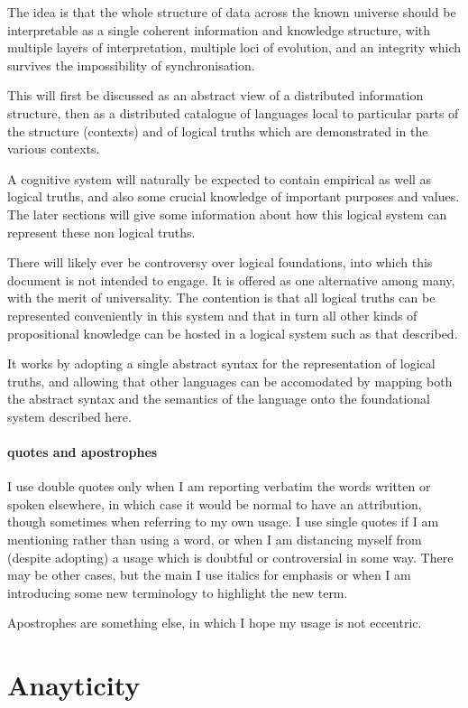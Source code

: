\documentclass[10pt,titlepage]{article}
\begin{document}
The idea is that the whole structure of data across the known universe should be interpretable as a single coherent information and knowledge structure, with multiple layers of interpretation, multiple loci of evolution, and an integrity which survives the impossibility of synchronisation.

This will first be discussed as an abstract view of a distributed information structure, then as a distributed catalogue of languages local to particular parts of the structure (contexts) and of logical truths which are demonstrated in the various contexts.

A cognitive system will naturally be expected to contain empirical as well as logical truths, and also some crucial knowledge of important purposes and values.
The later sections will give some information about how this logical system can represent these non logical truths.

There will likely ever be controversy over logical foundations, into which this document is not intended to engage.
It is offered as one alternative among many, with the merit of universality.
The contention is that all logical truths can be represented conveniently in this system and that in turn all other kinds of propositional knowledge can be hosted in a logical system such as that described.

It works by adopting a single abstract syntax for the representation of logical truths, and allowing that other languages can be accomodated by mapping both the abstract syntax and the semantics of the language onto the foundational system described here.

\paragraph{quotes and apostrophes}

I use double quotes only when I am reporting verbatim the words written or spoken elsewhere, in which case it would be normal to have an attribution, though sometimes when referring to my own usage.
I use single quotes if I am mentioning rather than using a word, or when I am distancing myself from (despite adopting) a usage which is doubtful or controversial in some way.
There may be other cases, but the main
I use italics for emphasis or when I am introducing some new terminology to highlight the new term.

Apostrophes are something else, in which I hope my usage is not eccentric.

\section{Anayticity}
\end{document}
